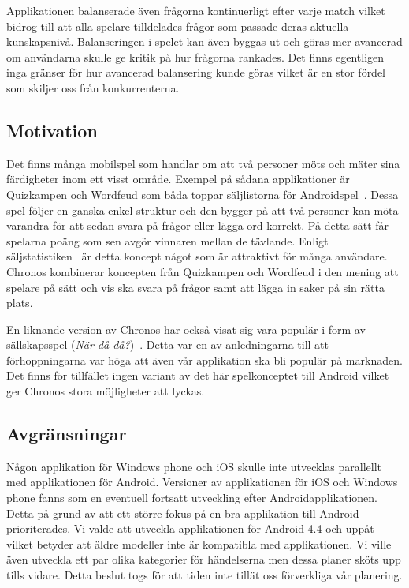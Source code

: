 \documentclass[a4paper, 11pt]{article}
\begin{document}
Applikationen balanserade även frågorna kontinuerligt efter varje match vilket bidrog till att alla spelare tilldelades frågor som passade deras aktuella kunskapsnivå. Balanseringen i spelet kan även byggas ut och göras mer avancerad om användarna skulle ge kritik på hur frågorna rankades. Det finns egentligen inga gränser för hur avancerad balansering kunde göras vilket är en stor fördel som skiljer oss från konkurrenterna.


\subsection{Motivation}
Det finns många mobilspel som handlar om att två personer möts och mäter sina färdigheter inom ett visst område. Exempel på sådana applikationer är Quizkampen och Wordfeud som båda toppar säljlistorna för Androidspel~\cite{appsalesrating}. Dessa spel följer en ganska enkel struktur och den bygger på att två personer kan möta varandra för att sedan svara på frågor eller lägga ord korrekt. På detta sätt får spelarna poäng som sen avgör vinnaren mellan de tävlande. Enligt säljstatistiken~\cite{appsalesrating} är detta koncept något som är attraktivt för många användare. Chronos kombinerar koncepten från Quizkampen och Wordfeud i den mening att spelare på sätt och vis ska svara på frågor samt att lägga in saker på sin rätta plats. 

En liknande version av Chronos har också visat sig vara populär i form av sällskapsspel (\textit{När-då-då?})~\cite{nardada}. Detta var en av anledningarna till att förhoppningarna var höga att även vår applikation ska bli populär på marknaden. Det finns för tillfället ingen variant av det här spelkonceptet till Android vilket ger Chronos stora möjligheter att lyckas.

\subsection{Avgränsningar}
Någon applikation för Windows phone och iOS skulle inte utvecklas parallellt med applikationen för Android. Versioner av applikationen för iOS och Windows phone fanns som en eventuell fortsatt utveckling efter Androidapplikationen. Detta på grund av att ett större fokus på en bra applikation till Android prioriterades. Vi valde att utveckla applikationen för Android 4.4 och uppåt vilket betyder att äldre modeller inte är kompatibla med applikationen.
Vi ville även utveckla ett par olika kategorier för händelserna men dessa planer sköts upp tills vidare. Detta beslut togs för att tiden inte tillät oss förverkliga vår planering.
\end{document}
